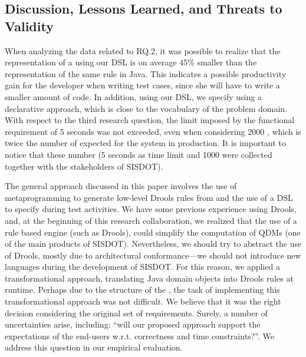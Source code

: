 \subsection{Discussion, Lessons Learned, and Threats to Validity}

When analyzing the data related to RQ.2, it was possible to realize that the representation 
of a \shc using our DSL is on average 45\% smaller than the representation of the same rule in Java. 
This indicates a possible productivity gain for the developer when writing test cases, 
since she will have to write a smaller amount of code. In addition, using our DSL, we 
specify \callers using a declarative approach, which is close to the vocabulary of 
the problem domain. With respect to the third research question, the limit imposed by the
functional requirement of 5 seconds was not exceeded, even when considering 2000 \callers,
which is twice the number of \callers expected for the system in production. It is important
to notice that these number (5 seconds as time limit and 1000 \callers were collected together
with the stakeholders of SISDOT).

The general approach discussed in this paper involves the use of metaprogramming
to generate low-level Drools rules from \callers and the use of a DSL to specify
\callers during test activities. We have some previous experience using Drools,
and, at the beginning of this research collaboration, we realized that the use of
a rule based engine (such as Drools), could simplify the computation of QDMs
(one of the main products of SISDOT). Nevertheless, we should try to abstract
the use of Drools, mostly due to architectural conformance---we should not
introduce new languages during the development of SISDOT. For this reason, we applied a
transformational approach, translating Java domain objects into
Drools rules at runtime. Perhaps due to the structure of the \callers, the task of implementing
this transformational approach was not difficult. We believe that it was the
right decision considering the original set of requirements. Surely, a number of uncertainties arise,
including: ``will our proposed approach support
the expectations of the end-users w.r.t. correctness
and time constraints?''. We address this question in our empirical evaluation.

